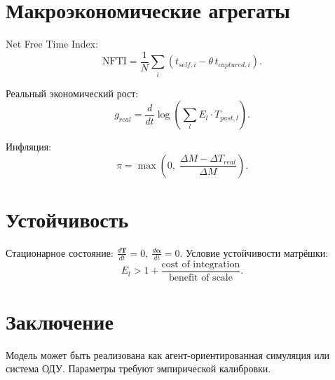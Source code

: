 \documentclass[12pt]{article}
\begin{document}
\section{Макроэкономические агрегаты}
Net Free Time Index:
\[
\text{NFTI} = \frac{1}{N}\sum_i (t_{self,i} - \theta\, t_{captured,i}).
\]

Реальный экономический рост:
\[
g_{real} = \frac{d}{dt}\log\left( \sum_l E_l \cdot T_{past,l} \right).
\]

Инфляция:
\[
\pi = \max\left(0,\; \frac{\Delta M - \Delta T_{real}}{\Delta M}\right).
\]

\section{Устойчивость}
Стационарное состояние: $\frac{d\mathbf{T}}{dt}=0,\ \frac{d\boldsymbol{\alpha}}{dt}=0$.
Условие устойчивости матрёшки:
\[
E_l > 1 + \frac{\text{cost of integration}}{\text{benefit of scale}}.
\]

\section*{Заключение}
Модель может быть реализована как агент-ориентированная симуляция или система ОДУ. Параметры требуют эмпирической калибровки.
\end{document}
